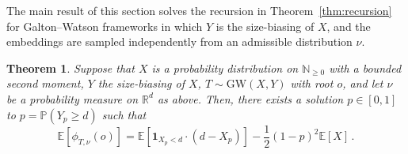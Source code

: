 \documentclass[reqno,english]{amsart}
\numberwithin{equation}{section}
\newtheorem{theorem}{Theorem}[section]
\theoremstyle{definition}{
\newtheorem{example}[theorem]{Example}
\newtheorem{definition}[theorem]{Definition}
\newtheorem*{definition*}{Definition}
\newtheorem{problem}[theorem]{Problem}
\newtheorem{question}[theorem]{Question}
}
\newcommand{\E}{\mathbb E}
\newcommand{\N}{\mathbb N}
\renewcommand{\P}{\mathbb P}
\newcommand{\R}{\mathbb R}
\begin{document}
The main result of this section solves the recursion in Theorem~\ref{thm:recursion} for Galton--Watson frameworks in which $Y$ is the size-biasing of $X$,
and the embeddings are sampled independently from an admissible distribution $\nu$.

\begin{theorem}\label{thm:Exp_loc_flex}
    Suppose that $X$ is a probability distribution on $\N_{\ge 0}$ with a bounded second moment, $Y$ the size-biasing of $X$, $T\sim \mathrm{GW}(X,Y)$ with root $o$, and let $\nu$ be a probability measure on $\R^d$ as above. Then, there exists a solution $p \in [0,1]$ to $p=\P(Y_p\ge d)$ such that
    \begin{equation}\label{eq:Xformula}
    \E[\phi_{T,\nu}(o)] = \E[\mathbf 1_{X_p<d}\cdot(d-X_{p})] - \frac12(1-p)^2\E[X]\,.
    \end{equation}
    
\end{theorem}
\end{document}

